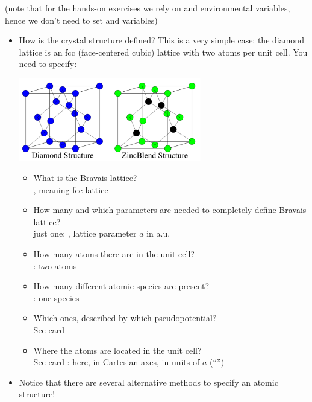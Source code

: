 \documentclass[landscape]{foils}
\begin{document}
(note that for the hands-on exercises we rely on
 and  environmental
variables, hence we don't need to set  and
 variables)

\begin{itemize}
\item[]
\parbox{15cm}{How is the crystal structure defined? This is a very
simple case: the diamond lattice is an fcc (face-centered cubic) lattice
with two atoms per unit cell. You need to specify:}\hskip 1cm
\parbox{10cm}{\includegraphics[width=8cm]{figs/Dia-ZB.pdf}}
\begin{itemize}
\item  What is the Bravais lattice?\\
  {\gray {}, meaning fcc lattice}
\item  How many and which parameters are needed to completely 
  define Bravais lattice?\\
  {\gray just one: , lattice parameter $a$ in a.u.}
\item  How many atoms there are in the unit cell?\\
{\gray  {}: two atoms}
\item  How many different atomic species are present?\\
{\gray  {}: one species}
\item  Which ones, described by which pseudopotential? \\
{\gray  See card }
\item  Where the atoms are located in the unit cell?\\
{\gray  See card : here, in Cartesian axes,
       in units of $a$ (``'')}
\end{itemize}
\item[]Notice that there are several alternative methods to specify an atomic structure!
\end{itemize}
\end{document}
